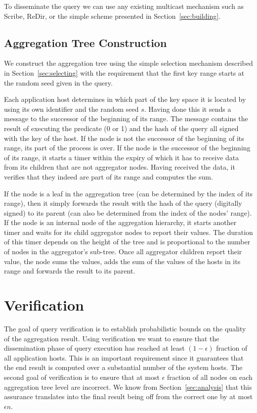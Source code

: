 \documentclass{article}
\begin{document}
To disseminate the query we can use any existing multicast mechanism
such as Scribe, ReDir, or the simple scheme presented in
Section~\ref{sec:building}. 


\subsection{Aggregation Tree Construction}
We construct the aggregation tree using the simple selection mechanism
described in Section~\ref{sec:selecting} with the requirement that the
first key range starts at the random seed given in the query.

Each application host determines in which part of the key space it is
located by using its own identifier and the random seed $s$. Having
done this it sends a message to the successor of the beginning of its
range. The message contains the result of executing the predicate (0
or 1) and the hash of the query all signed with the key of the host. If
the node is not the successor of the beginning of its range, its part
of the process is over. If the node is the successor of the beginning
of its range, it starts a timer within the expiry of which it  has to
receive data from its children that are not aggregator nodes. Having
received the data, it verifies that they indeed are part of its range
and computes the sum. 

If the node is a leaf in the
aggregation tree (can be determined by the index of its range), then
it simply forwards the result with the hash of the query (digitally
signed) to its parent (can also be determined from the index of the
nodes' range). If the node is an internal node of the aggregation
hierarchy, it starts another timer and waits for its child aggregator
nodes to report their values. The duration of this timer depends on
the height of the tree and is proportional to the number of nodes in
the aggregator's sub-tree. Once all aggregator children report their
value, the node sums the values, adds the sum of the values of the
hosts in its range and forwards the result to its parent. 

\section{Verification}
The goal of query verification is to establish probabilistic bounds on
the quality of the aggregation result. Using verification we want to
ensure that the dissemination phase of query execution has reached at
least $(1-\epsilon)$ fraction of all application hosts. This is an
important requirement since it guarantees that the end result is
computed over a substantial number of the system hosts. The second
goal of verification is to ensure that at most $\epsilon$ fraction of
all nodes on each aggregation tree level are incorrect. We know from
Section~\ref{sec:analysis} that this assurance translates into the
final result being off from the correct one by at most $\epsilon n$. 
\end{document}
